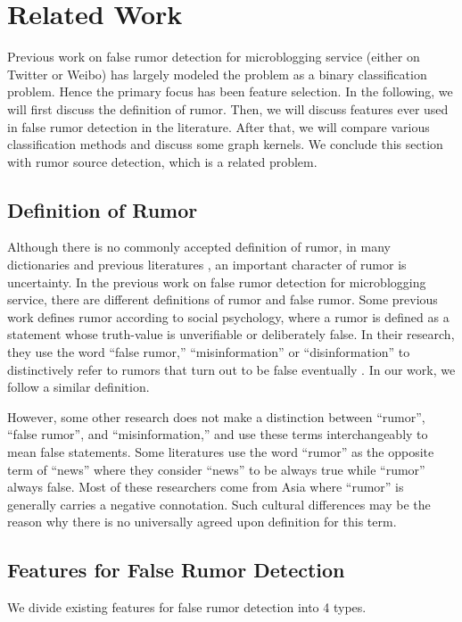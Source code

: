 \section{Related Work}
\label{sec:related}
Previous work on false rumor detection for microblogging service (either
on Twitter or Weibo) has largely modeled the problem as a
binary classification problem. Hence the primary focus has been feature
selection. In the following, we will first discuss the definition of rumor.
Then, we will discuss features ever used in false rumor detection
in the literature.
After that, we will compare various classification methods and discuss
some graph kernels. We conclude this section with rumor source detection,
which is a related problem.

\subsection{Definition of Rumor}
Although there is no commonly accepted definition of rumor,
in many dictionaries \cite{website:OxfordDic} and previous literatures
\cite{difonzo2007rumor}, an important character of rumor is uncertainty.
In the previous work on false rumor detection for microblogging service,
there are different definitions of rumor and false rumor.
Some previous work \cite{qazvinian2011rumor} defines rumor according
to social psychology, where a rumor is defined as a statement
whose truth-value is unverifiable or deliberately false.
In their research, they use the word ``false rumor,''
``misinformation'' or ``disinformation'' to distinctively refer to 
rumors that turn out to be false eventually
\cite{castillo2011information,okazaki2013extracting}.
In our work, we follow a similar definition.

However, some other research \cite{yang2012automatic,mendoza2010twitter}
does not make a distinction between ``rumor'', ``false rumor'',
and ``misinformation,'' and use these terms interchangeably to mean false
statements. Some literatures \cite{takahashi2012rumor,jin2013epidemiological}
use the word ``rumor'' as the opposite term of ``news'' where they
consider ``news'' to be always true while ``rumor'' always false.
Most of these researchers come from Asia where ``rumor'' is generally carries
a negative connotation. Such cultural differences may be the reason why
there is no universally agreed upon definition for this term.

\subsection{Features for False Rumor Detection}
We divide existing features for false rumor detection into 4 types.

